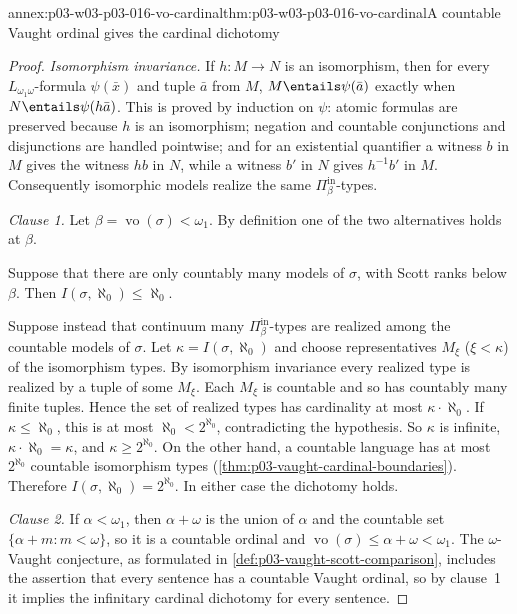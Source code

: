 \begin{annexitem}{annex:p03-w03-p03-016-vo-cardinal}{thm:p03-w03-p03-016-vo-cardinal}{A countable Vaught ordinal gives the cardinal dichotomy}
\begin{proof}
\emph{Isomorphism invariance.} If \(h:M\to N\) is an isomorphism, then for
every \(L_{\omega_1\omega}\)-formula \(\psi(\bar x)\) and tuple \(\bar a\)
from \(M\), \(M\entails\psi(\bar a)\) exactly when
\(N\entails\psi(h\bar a)\). This is proved by induction on \(\psi\):
atomic formulas are preserved because \(h\) is an isomorphism; negation and
countable conjunctions and disjunctions are handled pointwise; and for an
existential quantifier a witness \(b\) in \(M\) gives the witness \(hb\) in
\(N\), while a witness \(b'\) in \(N\) gives \(h^{-1}b'\) in \(M\).
Consequently isomorphic models realize the same
\(\Pi^{\mathrm{in}}_\beta\)-types.

\emph{Clause 1.} Let \(\beta=\operatorname{vo}(\sigma)<\omega_1\). By
definition one of the two alternatives holds at \(\beta\).

Suppose that there are only countably many models of \(\sigma\), with Scott
ranks below \(\beta\). Then \(I(\sigma,\aleph_0)\le\aleph_0\).

Suppose instead that continuum many \(\Pi^{\mathrm{in}}_\beta\)-types are
realized among the countable models of \(\sigma\). Let
\(\kappa=I(\sigma,\aleph_0)\) and choose representatives \(M_\xi\)
(\(\xi<\kappa\)) of the isomorphism types. By isomorphism invariance every
realized type is realized by a tuple of some \(M_\xi\). Each \(M_\xi\) is
countable and so has countably many finite tuples. Hence the set of
realized types has cardinality at most \(\kappa\cdot\aleph_0\). If
\(\kappa\le\aleph_0\), this is at most \(\aleph_0<2^{\aleph_0}\),
contradicting the hypothesis. So \(\kappa\) is infinite,
\(\kappa\cdot\aleph_0=\kappa\), and \(\kappa\ge2^{\aleph_0}\). On the other
hand, a countable language has at most \(2^{\aleph_0}\) countable
isomorphism types (\cref{thm:p03-vaught-cardinal-boundaries}). Therefore
\(I(\sigma,\aleph_0)=2^{\aleph_0}\). In either case the dichotomy holds.

\emph{Clause 2.} If \(\alpha<\omega_1\), then \(\alpha+\omega\) is the
union of \(\alpha\) and the countable set
\(\{\alpha+m:m<\omega\}\), so it is a countable ordinal and
\(\operatorname{vo}(\sigma)\le\alpha+\omega<\omega_1\). The
\(\omega\)-Vaught conjecture, as formulated in
\cref{def:p03-vaught-scott-comparison}, includes the assertion that every
sentence has a countable Vaught ordinal, so by clause~1 it implies the
infinitary cardinal dichotomy for every sentence.


\end{proof}
\end{annexitem}
